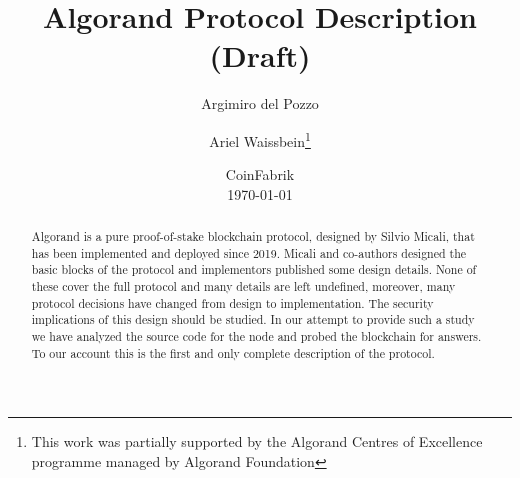 \documentclass[10pt,a4paper]{article}
\begin{document}
\author{Argimiro del Pozzo\and Ariel Waissbein\thanks{This work was partially supported by
the Algorand Centres of Excellence programme managed by Algorand Foundation}}
\date{CoinFabrik\\
\today}
\title{Algorand Protocol Description\\ 
(Draft)}

\maketitle
\tableofcontents


\begin{abstract}
    Algorand is a pure proof-of-stake blockchain protocol, designed by Silvio Micali,
    that has been implemented and deployed since 2019. Micali and co-authors designed 
    the basic blocks of the protocol and implementors published some design details.
    None of these cover the full protocol and many details are left undefined, moreover,
    many protocol decisions have changed from design to implementation. The security
    implications of this design should be studied. In our attempt to provide such a 
    study we have analyzed the source code for the node and probed the blockchain for 
    answers. To our account this is the first and only complete description of the 
    protocol. 
\end{abstract}
\end{document}
